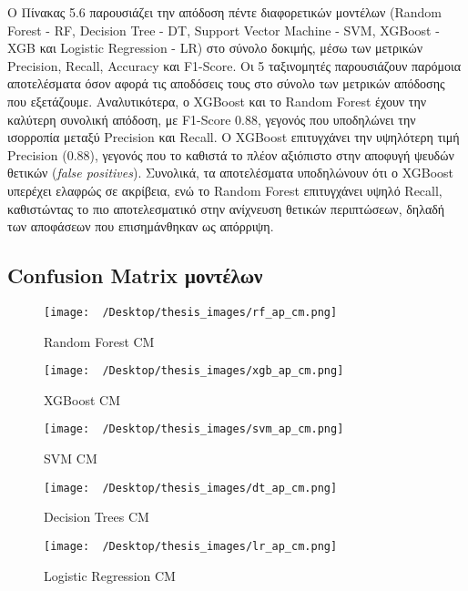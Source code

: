 \documentclass[diploma]{softlab-thesis}
\begin{document}
\begin{enumerate}
\begin{enumerate}
Ο Πίνακας 5.6 παρουσιάζει την απόδοση πέντε διαφορετικών μοντέλων (Random Forest - RF, Decision Tree - DT, Support Vector Machine - SVM, XGBoost - XGB και Logistic Regression - LR) στο σύνολο δοκιμής, μέσω των μετρικών Precision, Recall, Accuracy και F1-Score. Οι 5 ταξινομητές παρουσιάζουν παρόμοια αποτελέσματα όσον αφορά τις αποδόσεις τους στο σύνολο των μετρικών απόδοσης που εξετάζουμε.
Αναλυτικότερα, ο XGBoost και το Random Forest έχουν την καλύτερη συνολική απόδοση, με F1-Score 0.88, γεγονός που υποδηλώνει την ισορροπία μεταξύ Precision και Recall. O XGBoost επιτυγχάνει την υψηλότερη τιμή Precision (0.88), γεγονός που το καθιστά το πλέον αξιόπιστο στην αποφυγή ψευδών θετικών (\textit{false positives}). Συνολικά, τα αποτελέσματα υποδηλώνουν ότι ο XGBoost υπερέχει ελαφρώς σε ακρίβεια, ενώ το Random Forest επιτυγχάνει υψηλό Recall, καθιστώντας το πιο αποτελεσματικό στην ανίχνευση θετικών περιπτώσεων, δηλαδή των αποφάσεων που επισημάνθηκαν ως απόρριψη.

\subsection{Confusion Matrix μοντέλων}

\begin{figure}[H]
    \centering
    \texttt{[image: ~/Desktop/thesis\_images/rf\_ap\_cm.png]} %
    \caption{Random Forest CM}
    \label{fig:your_image_label}
\end{figure}

\begin{figure}[H]
    \centering
    \texttt{[image: ~/Desktop/thesis\_images/xgb\_ap\_cm.png]} %
    \caption{XGBoost CM}
    \label{fig:your_image_label}
\end{figure}

\begin{figure}[H]
    \centering
    \texttt{[image: ~/Desktop/thesis\_images/svm\_ap\_cm.png]} %
    \caption{SVM CM}
    \label{fig:your_image_label}
\end{figure}

\begin{figure}[H]
    \centering
    \texttt{[image: ~/Desktop/thesis\_images/dt\_ap\_cm.png]} %
    \caption{Decision Trees CM}
    \label{fig:your_image_label}
\end{figure}

\begin{figure}[H]
    \centering
    \texttt{[image: ~/Desktop/thesis\_images/lr\_ap\_cm.png]} %
    \caption{Logistic Regression CM}
    \label{fig:your_image_label}
\end{figure}




\end{enumerate}
\end{enumerate}
\end{document}
